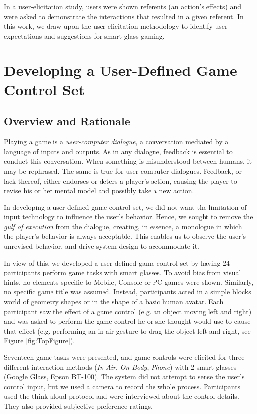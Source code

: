 \documentclass{sigchi}
\begin{document}
    In a user-elicitation study, users were shown referents (an action's effects) and were asked to demonstrate the interactions that resulted in a given referent\cite{Wobbrock:2009:UGS:1518701.1518866}. In this work, we draw upon the user-elicitation methodology to identify user expectations and suggestions for smart glass gaming.

\section{Developing a User-Defined Game Control Set}


    \subsection {Overview and Rationale}
    Playing a game is a \textsl{user-computer dialogue}\cite{userComputer}, a conversation mediated by a language of inputs and outputs. As in any dialogue, feedback is essential to conduct this conversation. When something is misunderstood between humans, it may be rephrased. The same is true for user-computer dialogues. Feedback, or lack thereof, either endorses or deters a player's action, causing the player to revise his or her mental model and possibly take a new action.

    In developing a user-defined game control set, we did not want the limitation of input technology to influence the user's behavior. Hence, we sought to remove the \textsl{gulf of execution}\cite{gulf} from the dialogue, creating, in essence, a monologue in which the player's behavior is always acceptable. This enables us to observe the user's unrevised behavior, and drive system design to accommodate it.

    In view of this, we developed a user-defined game control set by having 24 participants perform game tasks with smart glasses. To avoid bias from visual hints\cite{Epps:2006:SHS:1125451.1125601}, no elements specific to Mobile, Console or PC games were shown. Similarly, no specific game title was assumed. Instead, participants acted in a simple blocks world of geometry shapes or in the shape of a basic human avatar. Each participant saw the effect of a game control (e.g. an object moving left and right) and was asked to perform the game control he or she thought would use to cause that effect (e.g. performing an in-air gesture to drag the object left and right, see Figure \ref{fig:TopFigure}). 

    Seventeen game tasks were presented, and game controls were elicited for three different interaction methods (\emph{In-Air}, \emph{On-Body}, \emph{Phone}) with 2 smart glasses (Google Glass, Epson BT-100). The system did not attempt to sense the user's control input, but we used a camera to record the whole process. Participants used the think-aloud protocol and were interviewed about the control details. They also provided subjective preference ratings.
\end{document}
